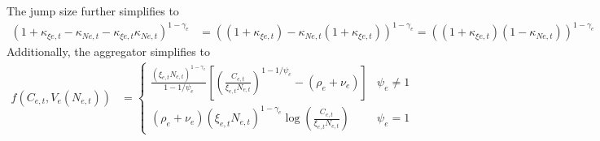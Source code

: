 \documentclass[12 pt, oneside]{article}
\theoremstyle{definition}
\theoremstyle{definition}
\theoremstyle{definition}
\begin{document}
The jump size further simplifies to
\begin{align*}
(1 + \kappa_{\xi e, t} - \kappa_{Ne, t} - \kappa_{\xi e, t}\kappa_{Ne, t})^{1 - \gamma_e} & = ((1 + \kappa_{\xi e, t}) - \kappa_{Ne, t}(1 + \kappa_{\xi e, t}))^{1 - \gamma_e}  = ((1 + \kappa_{\xi e, t})(1  - \kappa_{Ne, t}))^{1 - \gamma_e}
\end{align*}
Additionally, the aggregator simplifies to
\begin{align*}
f(C_{e, t}, V_e(N_{e, t})) & =
                             \begin{cases}
                               \frac{(\xi_{e, t} N_{e, t})^{ 1- \gamma_e}}{1 - 1/\psi_e}\left[\left(\frac{C_{e, t}}{\xi_{e, t}N_{e, t}  }\right)^{1 - 1 / \psi_e} - (\rho_e + \nu_e)\right] & \psi_e\neq 1\\
                              (\rho_e + \nu_e)(\xi_{e, t} N_{e, t})^{1 - \gamma_e}\log\left(\frac{C_{e, t}}{\xi_{e, t}N_{e, t}}\right) & \psi_e = 1
                             \end{cases}
\end{align*}
\end{document}
